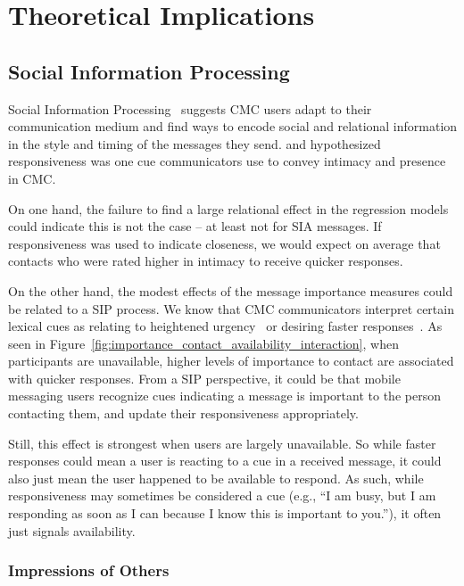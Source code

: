 \documentclass[12pt]{nuthesis}	%
\begin{document}
\section{Theoretical Implications}

\subsection{Social Information Processing}

Social Information Processing~\citep{walther1992interpersonal} suggests CMC users adapt to their communication medium and find ways to encode social and relational information in the style and timing of the messages they send. \citet{walther1995nonverbal} and \citet{kalman2006pauses} hypothesized responsiveness was one cue communicators use to convey intimacy and presence in CMC.

On one hand, the failure to find a large relational effect in the regression models could indicate this is not the case -- at least not for SIA messages. If responsiveness was used to indicate closeness, we would expect on average that contacts who were rated higher in intimacy to receive quicker responses.

On the other hand, the modest effects of the message importance measures could be related to a SIP process. We know that CMC communicators interpret certain lexical cues as relating to heightened urgency~\citep{nguyen2014lexical,nguyen2016effects} or desiring faster responses~\citep{cui2016beyond}. As seen in Figure~\ref{fig:importance_contact_availability_interaction}, when participants are unavailable, higher levels of importance to contact are associated with quicker responses. From a SIP perspective, it could be that mobile messaging users recognize cues indicating a message is important to the person contacting them, and update their responsiveness appropriately.

Still, this effect is strongest when users are largely unavailable. So while faster responses could mean a user is reacting to a cue in a received message, it could also just mean the user happened to be available to respond. As such, while responsiveness may sometimes be considered a cue (e.g., ``I am busy, but I am responding as soon as I can because I know this is important to you.''), it often just signals availability.

\subsubsection{Impressions of Others}
\end{document}

